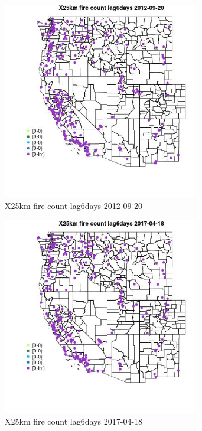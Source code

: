 \begin{figure} 
\centering  
\includegraphics[width=0.77\textwidth]{Code_Outputs/Report_ML_input_PM25_Step4_part_e_de_duplicated_aves_compiled_2019-05-14wNAs_MapObsX25km_fire_count_lag6days2012-09-20.jpg} 
\caption{\label{fig:Report_ML_input_PM25_Step4_part_e_de_duplicated_aves_compiled_2019-05-14wNAsMapObsX25km_fire_count_lag6days2012-09-20}X25km fire count lag6days 2012-09-20} 
\end{figure} 
 

\clearpage 

\begin{figure} 
\centering  
\includegraphics[width=0.77\textwidth]{Code_Outputs/Report_ML_input_PM25_Step4_part_e_de_duplicated_aves_compiled_2019-05-14wNAs_MapObsX25km_fire_count_lag6days2017-04-18.jpg} 
\caption{\label{fig:Report_ML_input_PM25_Step4_part_e_de_duplicated_aves_compiled_2019-05-14wNAsMapObsX25km_fire_count_lag6days2017-04-18}X25km fire count lag6days 2017-04-18} 
\end{figure} 
 

